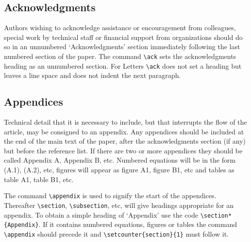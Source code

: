 \documentclass[12pt]{iopart}
\begin{document}
\subsection{Acknowledgments}
Authors wishing to acknowledge assistance or encouragement from 
colleagues, special work by technical staff or financial support from 
organizations should do so in an unnumbered `Acknowledgments' section 
immediately following the last numbered section of the paper. The 
command \verb"\ack" sets the acknowledgments heading as an unnumbered
section. For Letters 
\verb"\ack" does not set a heading but leaves a line space and does not 
indent the next paragraph.

\subsection{Appendices}
Technical detail that it is necessary to include, but that interrupts 
the flow of the article, may be consigned to an appendix. 
Any appendices should be included at the end of the main text of the paper, after the acknowledgments section (if any) but before the reference list.
If there are 
two or more appendices they should be called Appendix A, Appendix B, etc. 
Numbered equations will be in the form (A.1), (A.2), etc,
figures will appear as figure A1, figure B1, etc and tables as table A1,
table B1, etc.

The command \verb"\appendix" is used to signify the start of the
appendices. Thereafter \verb"\section", \verb"\subsection", etc, will 
give headings appropriate for an appendix. To obtain a simple heading of 
`Appendix' use the code \verb"\section*{Appendix}". If it contains
numbered equations, figures or tables the command \verb"\appendix" should
precede it and \verb"\setcounter{section}{1}" must follow it. 
 
\end{document}
